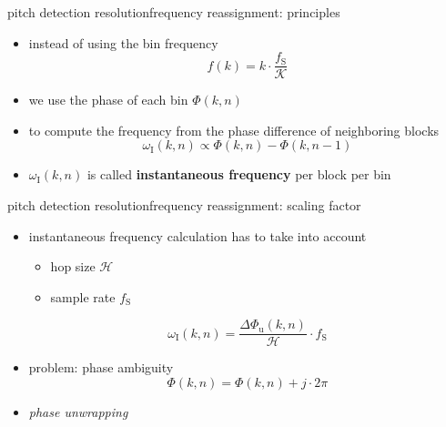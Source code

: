         \begin{frame}{pitch detection resolution}{frequency reassignment: principles}

            \begin{itemize}
                \item   instead of using the bin frequency
                    \[ f(k) = k\cdot\frac{f_\mathrm{S}}{\mathcal{K}}\]
                \smallskip
								\item   we use the phase of each bin $\Phi(k,n)$
                \smallskip
								\item   to compute the frequency from the phase difference of neighboring blocks
                    \begin{equation*}\label{eq:phasediff}
                        \omega_{\mathrm{I}}(k,n)	\propto \Phi(k,n)-\Phi(k,n-1)
                    \end{equation*}
                \smallskip
								\item<2->   $\omega_{\mathrm{I}}(k,n)$ is called \textbf{instantaneous frequency} per block per bin
            \end{itemize}
        \end{frame}
        \begin{frame}{pitch detection resolution}{frequency reassignment: scaling factor}
            \begin{itemize}
                \item instantaneous frequency calculation has to take into account
                    \begin{itemize}
                        \item   hop size $\mathcal{H}$
                        \item   sample rate $f_\mathrm{S}$
                    \end{itemize}
                
                    \begin{equation*}
                        \omega_{\mathrm{I}}(k,n) = \frac{\Delta\Phi_{\mathrm{u}}(k,n)}{\mathcal{H}}\cdot f_{\mathrm{S}} 
                    \end{equation*}
                \item<1-> problem: phase ambiguity
                    \begin{equation*}
                        \Phi(k,n) = \Phi(k,n) + j\cdot 2\pi
                    \end{equation*}
                \item<2->[$\Rightarrow$] \textit{phase unwrapping}
            \end{itemize}
        \end{frame}
